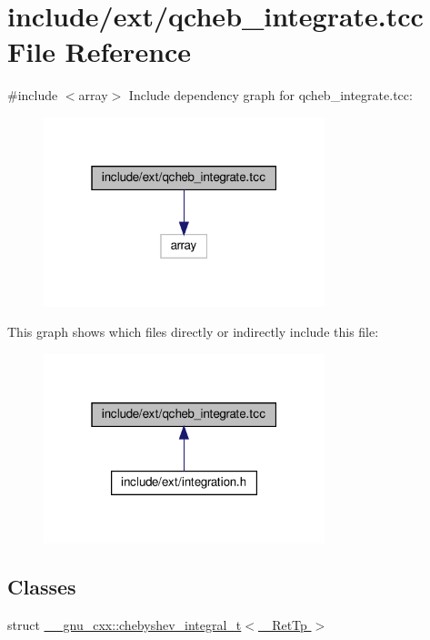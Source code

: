 \hypertarget{qcheb__integrate_8tcc}{}\section{include/ext/qcheb\+\_\+integrate.tcc File Reference}
\label{qcheb__integrate_8tcc}
{\ttfamily \#include $<$array$>$}\newline
Include dependency graph for qcheb\+\_\+integrate.\+tcc\+:
\nopagebreak
\begin{figure}[H]
\begin{center}
\leavevmode
\includegraphics[width=232pt]{qcheb__integrate_8tcc__incl}
\end{center}
\end{figure}
This graph shows which files directly or indirectly include this file\+:
\nopagebreak
\begin{figure}[H]
\begin{center}
\leavevmode
\includegraphics[width=232pt]{qcheb__integrate_8tcc__dep__incl}
\end{center}
\end{figure}
\subsection*{Classes}
\begin{DoxyCompactItemize}
\item 
struct \hyperlink{struct____gnu__cxx_1_1chebyshev__integral__t}{\+\_\+\+\_\+gnu\+\_\+cxx\+::chebyshev\+\_\+integral\+\_\+t$<$ \+\_\+\+Ret\+Tp $>$}
\end{DoxyCompactItemize}
